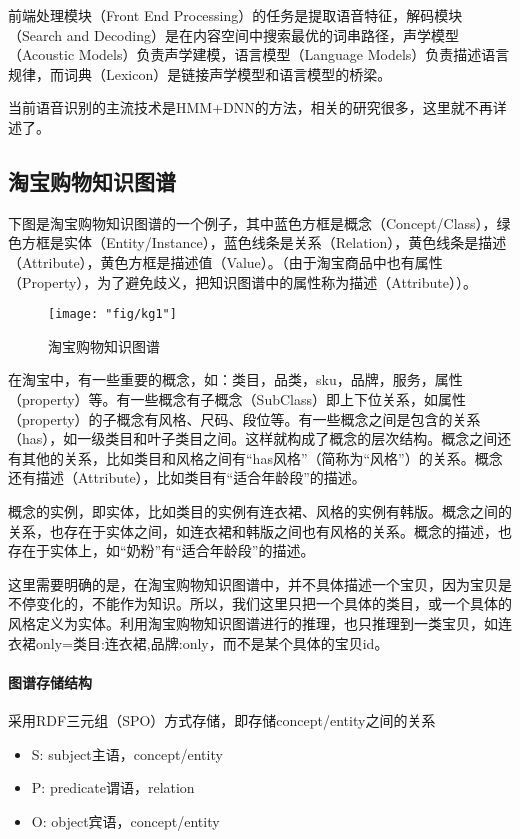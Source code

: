 前端处理模块（Front End Processing）的任务是提取语音特征，解码模块（Search and Decoding）是在内容空间中搜索最优的词串路径，声学模型（Acoustic Models）负责声学建模，语言模型（Language Models）负责描述语言规律，而词典（Lexicon）是链接声学模型和语言模型的桥梁。

当前语音识别的主流技术是HMM+DNN的方法，相关的研究很多，这里就不再详述了。

\subsection{淘宝购物知识图谱}

下图是淘宝购物知识图谱的一个例子，其中蓝色方框是概念（Concept/Class），绿色方框是实体（Entity/Instance），蓝色线条是关系（Relation），黄色线条是描述（Attribute），黄色方框是描述值（Value）。（由于淘宝商品中也有属性（Property），为了避免歧义，把知识图谱中的属性称为描述（Attribute））。

\begin{figure}[h]
	\centering
	\texttt{[image: "fig/kg1"]}
	\caption{淘宝购物知识图谱}
	\label{fig:kg1}
\end{figure}

在淘宝中，有一些重要的概念，如：类目，品类，sku，品牌，服务，属性（property）等。有一些概念有子概念（SubClass）即上下位关系，如属性（property）的子概念有风格、尺码、段位等。有一些概念之间是包含的关系（has），如一级类目和叶子类目之间。这样就构成了概念的层次结构。概念之间还有其他的关系，比如类目和风格之间有“has风格”（简称为“风格”）的关系。概念还有描述（Attribute），比如类目有“适合年龄段”的描述。

概念的实例，即实体，比如类目的实例有连衣裙、风格的实例有韩版。概念之间的关系，也存在于实体之间，如连衣裙和韩版之间也有风格的关系。概念的描述，也存在于实体上，如“奶粉”有“适合年龄段”的描述。

这里需要明确的是，在淘宝购物知识图谱中，并不具体描述一个宝贝，因为宝贝是不停变化的，不能作为知识。所以，我们这里只把一个具体的类目，或一个具体的风格定义为实体。利用淘宝购物知识图谱进行的推理，也只推理到一类宝贝，如连衣裙only=类目:连衣裙,品牌:only，而不是某个具体的宝贝id。

\paragraph{图谱存储结构}

采用RDF三元组（SPO）方式存储，即存储concept/entity之间的关系

\begin{itemize}
\item{S: subject主语，concept/entity}
\item{P: predicate谓语，relation}
\item{O: object宾语，concept/entity}
\end{itemize}

